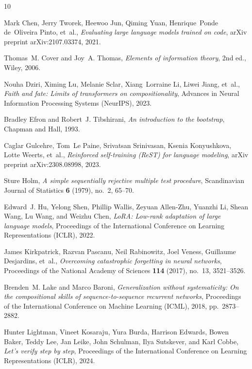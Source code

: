 \begin{thebibliography}{10}

Mark Chen, Jerry Tworek, Heewoo Jun, Qiming Yuan, Henrique~Ponde de~Oliveira
  Pinto, et~al., \emph{Evaluating large language models trained on code}, arXiv
  preprint arXiv:2107.03374, 2021.

Thomas~M. Cover and Joy~A. Thomas, \emph{Elements of information theory},
  2nd ed., Wiley, 2006.

Nouha Dziri, Ximing Lu, Melanie Sclar, Xiang~Lorraine Li, Liwei Jiang, et~al.,
  \emph{Faith and fate: Limits of transformers on compositionality}, Advances in
  Neural Information Processing Systems (NeurIPS), 2023.

Bradley Efron and Robert~J. Tibshirani, \emph{An introduction to the bootstrap},
  Chapman and Hall, 1993.

Caglar Gulcehre, Tom~Le Paine, Srivatsan Srinivasan, Ksenia Konyushkova,
  Lotte Weerts, et~al., \emph{Reinforced self-training ({ReST}) for language
  modeling}, arXiv preprint arXiv:2308.08998, 2023.

Sture Holm, \emph{A simple sequentially rejective multiple test procedure},
  Scandinavian Journal of Statistics \textbf{6} (1979), no.~2, 65--70.

Edward~J. Hu, Yelong Shen, Phillip Wallis, Zeyuan Allen-Zhu, Yuanzhi Li,
  Shean Wang, Lu Wang, and Weizhu Chen, \emph{{LoRA}: Low-rank adaptation of
  large language models}, Proceedings of the International Conference on
  Learning Representations (ICLR), 2022.

James Kirkpatrick, Razvan Pascanu, Neil Rabinowitz, Joel Veness,
  Guillaume Desjardins, et~al., \emph{Overcoming catastrophic forgetting in
  neural networks}, Proceedings of the National Academy of Sciences
  \textbf{114} (2017), no.~13, 3521--3526.

Brenden~M. Lake and Marco Baroni, \emph{Generalization without systematicity:
  On the compositional skills of sequence-to-sequence recurrent networks},
  Proceedings of the International Conference on Machine Learning (ICML), 2018,
  pp.~2873--2882.

Hunter Lightman, Vineet Kosaraju, Yura Burda, Harrison Edwards, Bowen Baker,
  Teddy Lee, Jan Leike, John Schulman, Ilya Sutskever, and Karl Cobbe,
  \emph{Let's verify step by step}, Proceedings of the International Conference
  on Learning Representations (ICLR), 2024.


\end{thebibliography}

